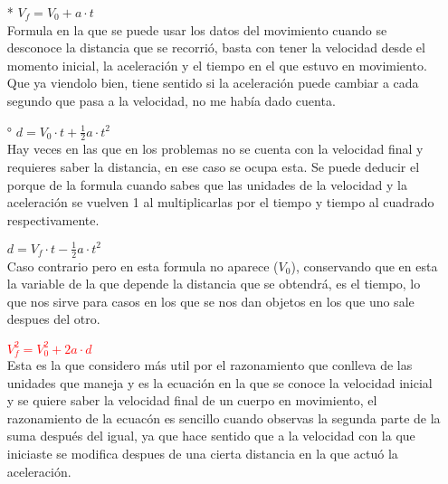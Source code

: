 \documentclass[letterpaper, 12pt]{article}
\begin{document}
    \begin{itemize}
        \item[\textcolor{Simbolos}{*}] $V_{f} = V_{0} + a\cdot t$\\
        
        
        Formula en la que se puede usar los datos del movimiento cuando se desconoce la distancia que se recorrió, basta con tener la velocidad desde el momento inicial, la aceleración y el tiempo en el que estuvo en movimiento. Que ya viendolo bien, tiene sentido si la aceleración puede cambiar a cada segundo que pasa a la velocidad, no me había dado cuenta.\\
        
        \item[\textcolor{Simbolos}{°}] $d= V_{0} \cdot t + \frac{1}{2}a \cdot t^{2} $\\
        
        Hay veces en las que en los problemas no se cuenta con la velocidad final y requieres saber la distancia, en ese caso se ocupa esta. Se puede deducir el porque de la formula cuando sabes que las unidades de la velocidad y la aceleración se vuelven 1 al multiplicarlas por el tiempo y tiempo al cuadrado respectivamente.\\
        
        \item[\textcolor{Simbolos}{\clubsuit}] $d = V_{f}\cdot t-\frac{1}{2}a\cdot t^{2}$\\
        
        Caso contrario pero en esta formula no aparece ($V_{0}$), conservando que en esta la variable de la que depende la distancia que se obtendrá, es el tiempo, lo que nos sirve para casos en los que se nos dan objetos en los que uno sale despues del otro.\\
        
        \item[\textcolor{Simbolos}{\bigstar}] \textcolor{red}{$V_{f}^{2} = V_{0}^{2} +2a\cdot d$}\\
        
        Esta es la que considero más util por el razonamiento que conlleva de las unidades que maneja  y es la ecuación en la que se conoce la velocidad inicial y se quiere saber la velocidad final de un cuerpo en movimiento, el razonamiento de la ecuac\'on es sencillo cuando observas la segunda parte de la suma después del igual, ya que hace sentido que a la velocidad con la que iniciaste se modifica despues de una cierta distancia en la que actuó la aceleración.
        

\end{itemize}
\end{document}
